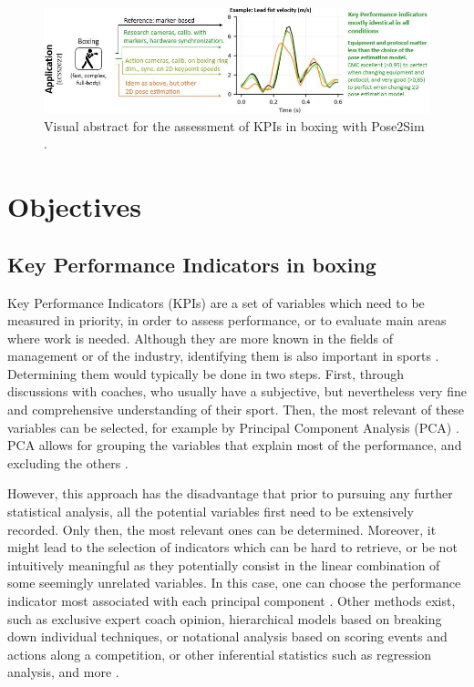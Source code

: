 \clearpage

\minitoc

\vspace*{3cm}

\begin{figure}[hbtp]
	\centering
	\def\svgwidth{1\columnwidth}
	\fontsize{10pt}{10pt}\selectfont
	\includegraphics[width=\linewidth]{"../Intro/Figures/Fig_VisAbstract4.JPG"}
      \caption{Visual abstract for the assessment of KPIs in boxing with Pose2Sim \cite{Pagnon2022c}.}
	\label{fig_visabstract4}
\end{figure}

\newpage






\section{Objectives}

\subsection{Key Performance Indicators in boxing}

Key Performance Indicators (KPIs) are a set of variables which need to be measured in priority, in order to assess performance, or to evaluate main areas where work is needed. Although they are more known in the fields of management or of the industry, identifying them is also important in sports \cite{Hughes2002,Butterworth2013}. Determining them would typically be done in two steps. First, through discussions with coaches, who usually have a subjective, but nevertheless very fine and comprehensive understanding of their sport. Then, the most relevant of these variables can be selected, for example by Principal Component Analysis (PCA) \cite{Hotelling1933}. PCA allows for grouping the variables that explain most of the performance, and excluding the others \cite{ODonoghue2008}.

However, this approach has the disadvantage that prior to pursuing any further statistical analysis, all the potential variables first need to be extensively recorded. Only then, the most relevant ones can be determined. Moreover, it might lead to the selection of indicators which can be hard to retrieve, or be not intuitively meaningful as they potentially consist in the linear combination of some seemingly unrelated variables. In this case, one can choose the performance indicator most associated with each principal component \cite{ODonoghue2008}. Other methods exist, such as exclusive expert coach opinion, hierarchical models based on breaking down individual techniques, or notational analysis based on scoring events and actions along a competition, or other inferential statistics such as regression analysis, and more \cite{Hughes2002,Butterworth2013}.

